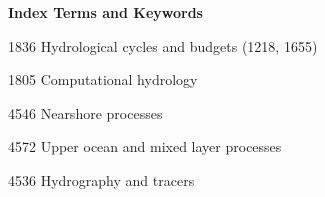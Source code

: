 \textbf{Index Terms and Keywords}

1836 Hydrological cycles and budgets (1218, 1655)

1805 Computational hydrology

4546 Nearshore processes

4572 Upper ocean and mixed layer processes

4536 Hydrography and tracers
